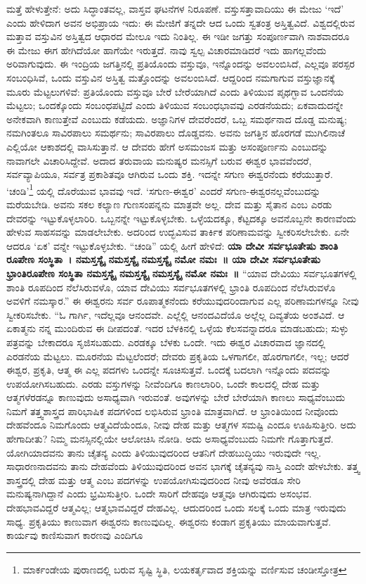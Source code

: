 ಮತ್ತೆ ಹೇಳುತ್ತೇನೆ: ಅದು ಸಿದ್ಧಾಂತವಲ್ಲ, ವಾಸ್ತವ ಘಟನೆಗಳ ನಿರೂಪಣೆ. ವಸ್ತುಸತ್ತಾವಾದಿಯು  ಈ ಮೇಜು ‘ಇದೆ’ ಎಂದು ಹೇಳಿದಾಗ ಅವನ ಅಭಿಪ್ರಾಯ ಇದು: ಈ ಮೇಜಿಗೆ ತನ್ನದೇ ಆದ ಒಂದು ಸ್ವತಂತ್ರ ಅಸ್ತಿತ್ವವಿದೆ. ವಿಶ್ವದಲ್ಲಿರುವ ಮತ್ತಾವ ವಸ್ತುವಿನ ಅಸ್ತಿತ್ವದ ಆಧಾರದ ಮೇಲೂ ಇದು ನಿಂತಿಲ್ಲ. ಈ ಇಡೀ ಜಗತ್ತು ಸಂಪೂರ್ಣವಾಗಿ ನಾಶವಾದರೂ ಈ ಮೇಜು ಈಗ ಹೇಗಿದೆಯೋ ಹಾಗೆಯೇ ಇರುತ್ತದೆ. ನಾವು ಸ್ವಲ್ಪ ವಿಚಾರಮಾಡಿದರೆ ಇದು ಹಾಗಲ್ಲವೆಂದು ಅರಿವಾಗುವುದು. ಈ ಇಂದ್ರಿಯ ಜಗತ್ತಿನಲ್ಲಿ ಪ್ರತಿಯೊಂದು ವಸ್ತುವೂ, ಇನ್ನೊಂದನ್ನು ಅವಲಂಬಿಸಿದೆ, ಎಲ್ಲವೂ ಪರಸ್ಪರ ಸಂಬಂಧಿಸಿವೆ, ಒಂದು ವಸ್ತುವಿನ ಅಸ್ತಿತ್ವ ಮತ್ತೊಂದನ್ನು ಅವಲಂಬಿಸಿದೆ. ಆದ್ದರಿಂದ ನಮಗಾಗುವ ವಸ್ತುಜ್ಞಾನಕ್ಕೆ ಮೂರು ಮೆಟ್ಟಲುಗಳಿವೆ: ಪ್ರತಿಯೊಂದು ವಸ್ತುವೂ ಬೇರೆ ಬೇರೆಯಾಗಿದೆ ಎಂದು ತಿಳಿಯುವ ಪೃಥಗ್ಭಾವ ಒಂದನೆಯ ಮೆಟ್ಟಲು; ಒಂದಕ್ಕೊಂದು ಸಂಬಂಧಪಟ್ಟಿದೆ ಎಂದು ತಿಳಿಯುವ ಸಂಬಂಧಭಾವವು ಎರಡನೆಯದು; ಏಕವಾದುದನ್ನೇ ಅನೇಕವಾಗಿ ಕಾಣುತ್ತೇವೆ ಎಂಬುದು ಕಡೆಯದು. ಅಜ್ಞಾನಿಗಳ ದೇವರೆಂದರೆ, ಒಬ್ಬ ಸಮರ್ಥನಾದ ದೊಡ್ಡ ಮನುಷ್ಯ; ನಮಗಿಂತಲೂ ಸಾವಿರಪಾಲು ಸಮರ್ಥನು; ಸಾವಿರಪಾಲು ದೊಡ್ಡವನು. ಅವನು ಜಗತ್ತಿನ ಹೊರಗಡೆ ಮುಗಿಲಿನಾಚೆ ಎಲ್ಲಿಯೋ ಆಕಾಶದಲ್ಲಿ ವಾಸಿಸುತ್ತಾನೆ. ಆ ದೇವರು ಹೇಗೆ ಅಸಮಂಜಸ ಮತ್ತು ಅಸಂಪೂರ್ಣನು ಎಂಬುದನ್ನು ನಾವಾಗಲೇ ವಿಚಾರಿಸಿದ್ದೇವೆ. ಅದಾದ ತರುವಾಯ ಮನುಷ್ಯರ ಮನಸ್ಸಿಗೆ ಬರುವ ಈಶ್ವರ ಭಾವವೆಂದರೆ, ಸರ್ವವ್ಯಾಪಿಯೂ, ಸರ್ವತ್ರ ಪ್ರಕಾಶಿತವೂ ಆಗಿರುವ ಒಂದು ಶಕ್ತಿ. ಇದನ್ನೇ ಸಗುಣ ಈಶ್ವರನೆಂದು ಕರೆಯುತ್ತಾರೆ. ‘ಚಂಡಿ’\footnote{ಮಾರ್ಕಂಡೇಯ ಪುರಾಣದಲ್ಲಿ ಬರುವ ಸೃಷ್ಟಿ ಸ್ಥಿತಿ, ಲಯಕರ್ತೃವಾದ ಶಕ್ತಿಯನ್ನು ವರ್ಣಿಸುವ ಚಂಡೀಸ್ತೋತ್ರ} ಯಲ್ಲಿ ದೊರೆಯುವ ಭಾವವು ಇದೆ. ‘ಸಗುಣ-ಈಶ್ವರ’ ಎಂದರೆ ಸಗುಣ-ಈಶ್ವರನಲ್ಲವೆಂಬುದನ್ನು ಮರೆಯಬೇಡಿ. ಅವನು ಸಕಲ ಕಲ್ಯಾಣ ಗುಣಸಂಪನ್ನನು ಮಾತ್ರವೇ ಅಲ್ಲ. ದೇವ ಮತ್ತು ಸೈತಾನ ಎಂಬ ಎರಡು ದೇವರನ್ನು ಇಟ್ಟುಕೊಳ್ಳಲಾರಿರಿ. ಒಬ್ಬನನ್ನೇ ಇಟ್ಟುಕೊಳ್ಳಬೇಕು. ಒಳ್ಳೆಯದಕ್ಕೂ, ಕೆಟ್ಟದಕ್ಕೂ ಅವನೊಬ್ಬನೇ ಕಾರಣವೆಂದು ಹೇಳುವ ಸಾಹಸವನ್ನು ಮಾಡಲೇಬೇಕು. ಅದರಿಂದ ಉದ್ಭವಿಸುವ ತಾರ್ಕಿಕ ಪರಿಣಾಮವನ್ನು ಸ್ವೀಕರಿಸಲೇಬೇಕು. ಏನೇ ಆದರೂ ‘ಏಕ’ ವನ್ನೇ ಇಟ್ಟುಕೊಳ್ಳಬೇಕು. “ಚಂಡಿ” ಯಲ್ಲಿ ಹೀಗೆ ಹೇಳಿದೆ: \textbf{ಯಾ ದೇವೀ ಸರ್ವಭೂತೇಷು ಶಾಂತಿ ರೂಪೇಣ ಸಂಸ್ಥಿತಾ~। ನಮಸ್ತಸ್ಯೈ ನಮಸ್ತಸ್ಯೈ ನಮಸ್ತಸ್ಯೈ ನಮೋ ನಮಃ~॥ ಯಾ ದೇವೀ ಸರ್ವಭೂತೇಷು ಭ್ರಾಂತಿರೂಪೇಣ ಸಂಸ್ಥಿತಾ ನಮಸ್ತಸ್ಯೈ ನಮಸ್ತಸ್ಯೈ ನಮಸ್ತಸ್ಯೈ ನಮೋ ನಮಃ~॥} “ಯಾವ ದೇವಿಯು ಸರ್ವಭೂತಗಳಲ್ಲಿ ಶಾಂತಿ ರೂಪದಿಂದ ನೆಲೆಸಿರುವಳೊ, ಯಾವ ದೇವಿಯು ಸರ್ವಭೂತಗಳಲ್ಲಿ ಭ್ರಾಂತಿ ರೂಪದಿಂದ ನೆಲೆಸಿರುವಳೊ ಅವಳಿಗೆ ನಮಸ್ಕಾರ.” ಈ ಈಶ್ವರನು ಸರ್ವ ರೂಪಾತ್ಮಕನೆಂದು ಕರೆಯುವುದರಿಂದಾಗುವ ಎಲ್ಲ ಪರಿಣಾಮಗಳನ್ನೂ ನೀವು ಸ್ವೀಕರಿಸಬೇಕು. “ಓ ಗಾರ್ಗಿ, ಇದೆಲ್ಲವೂ ಆನಂದವೇ. ಎಲ್ಲೆಲ್ಲಿ ಆನಂದವಿದೆಯೊ ಅಲ್ಲೆಲ್ಲ ದಿವ್ಯತೆಯ ಅಂಶವಿದೆ. ಆ ಏಕಾತ್ಮನು ನನ್ನ ಮುಂದಿರುವ ಈ ದೀಪದಂತೆ. ಇದರ ಬೆಳಕಿನಲ್ಲಿ ಒಳ್ಳೆಯ ಕೆಲಸವನ್ನಾದರೂ ಮಾಡಬಹುದು; ಸುಳ್ಳು ಪತ್ರವನ್ನು ಬೇಕಾದರೂ ಸೃಜಿಸಬಹುದು. ಎರಡಕ್ಕೂ ಬೆಳಕು ಒಂದೇ. ಇದು ಈಶ್ವರ ವಿಚಾರವಾದ ಜ್ಞಾನದಲ್ಲಿ ಎರಡನೆಯ ಮೆಟ್ಟಲು. ಮೂರನೆಯ ಮೆಟ್ಟಲೆಂದರೆ; ದೇವರು ಪ್ರಕೃತಿಯ ಒಳಗಾಗಲೀ, ಹೊರಗಾಗಲೀ, ಇಲ್ಲ; ಆದರೆ ಈಶ್ವರ, ಪ್ರಕೃತಿ, ಆತ್ಮ ಈ ಎಲ್ಲ ಪದಗಳು ಒಂದನ್ನೇ ಸೂಚಿಸುತ್ತವೆ. ಒಂದಕ್ಕೆ ಬದಲಾಗಿ ಇನ್ನೊಂದು ಪದವನ್ನು ಉಪಯೋಗಿಸಬಹುದು. ಎರಡು ವಸ್ತುಗಳನ್ನು ನೀವೆಂದಿಗೂ ಕಾಣಲಾರಿರಿ, ಒಂದೇ ಕಾಲದಲ್ಲಿ ದೇಹ ಮತ್ತು ಆತ್ಮಗಳೆರಡನ್ನೂ ಕಾಣುವುದು ಅಸಾಧ್ಯವಾಗಿ ಇರುವಂತೆ. ಅವುಗಳನ್ನು ಬೇರೆ ಬೇರೆಯಾಗಿ ಕಾಣಲು ಸಾಧ್ಯವೆಂಬುದು ನಿಮಗೆ ತತ್ತ್ವಶಾಸ್ತ್ರದ ಪಾರಿಭಾಷಿಕ ಪದಗಳಿಂದ ಲಭಿಸಿರುವ ಭ್ರಾಂತಿ ಮಾತ್ರವಾಗಿದೆ. ಆ ಭ್ರಾಂತಿಯಿಂದ ನೀವೊಂದು ದೇಹವೆಂದೂ ನಿಮಗೊಂದು ಆತ್ಮವಿದೆಯೆಂದೂ, ನೀವು ದೇಹ ಮತ್ತು ಆತ್ಮಗಳ ಸಮಷ್ಟಿ ಎಂದೂ ಊಹಿಸುತ್ತೀರಿ. ಅದು ಹೇಗಾದೀತು? ನಿಮ್ಮ ಮನಸ್ಸಿನಲ್ಲಿಯೇ ಆಲೋಚಿಸಿ ನೋಡಿ. ಅದು ಅಸಾಧ್ಯವೆಂಬುದು ನಿಮಗೇ ಗೊತ್ತಾಗುತ್ತದೆ. ಯೋಗಿಯಾದವನು ತಾನು ಚೈತನ್ಯ ಎಂದು ತಿಳಿಯುವುದರಿಂದ ಆತನಿಗೆ ದೇಹಬುದ್ಧಿಯು ಇರುವುದೇ ಇಲ್ಲ. ಸಾಧಾರಣನಾದವನು ತಾನು ದೇಹವೆಂದು ತಿಳಿಯುವುದರಿಂದ ಅವನ ಭಾಗಕ್ಕೆ ಚೈತನ್ಯವು ನಾಸ್ತಿ ಎಂದೇ ಹೇಳಬೇಕು. ತತ್ತ್ವ ಶಾಸ್ತ್ರದಲ್ಲಿ ದೇಹ ಮತ್ತು ಆತ್ಮ ಎಂಬ ಪದಗಳನ್ನು ಉಪಯೋಗಿಸುವುದರಿಂದ ನೀವು ಅವೆರಡೂ ಸೇರಿ ಮನುಷ್ಯನಾಗಿದ್ದಾನೆ ಎಂದು ಭ್ರಮಿಸುತ್ತೀರಿ. ಒಂದೇ ಸಾರಿಗೆ ದೇಹವೂ ಆತ್ಮವೂ ಆಗಿರುವುದು ಅಸಂಭವ. ದೇಹಭಾವವಿದ್ದರೆ ಆತ್ಮವಿಲ್ಲ; ಆತ್ಮಭಾವವಿದ್ದರೆ ದೇಹವಿಲ್ಲ. ಆದುದರಿಂದ ಒಂದು ಸಲಕ್ಕೆ ಒಂದು ಮಾತ್ರ ಇರುವುದು ಸಾಧ್ಯ. ಪ್ರಕೃತಿಯು ಕಾಣುವಾಗ ಈಶ್ವರನು ಕಾಣುವುದಿಲ್ಲ. ಈಶ್ವರನು ಕಂಡಾಗ ಪ್ರಕೃತಿಯು ಮಾಯವಾಗುತ್ತವೆ. ಕಾರ್ಯವು ಕಾಣಿಸುವಾಗ ಕಾರಣವು ಎಂದಿಗೂ 